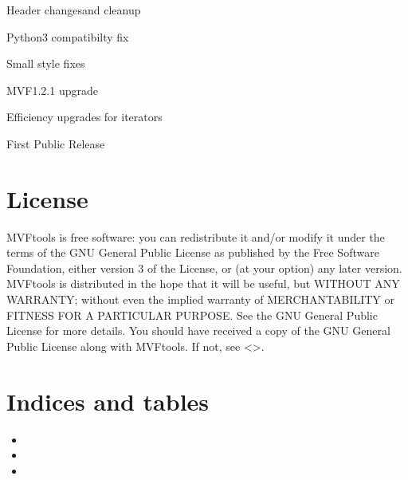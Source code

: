 \documentclass[letterpaper,11pt,english]{sphinxmanual}
\begin{document}

Header changesand cleanup


Python3 compatibilty fix


Small style fixes


MVF1.2.1 upgrade


Efficiency upgrades for iterators


First Public Release


\chapter{License}
\label{\detokenize{version:license}}
MVFtools is free software: you can redistribute it and/or modify
it under the terms of the GNU General Public License as published by
the Free Software Foundation, either version 3 of the License, or
(at your option) any later version.
MVFtools is distributed in the hope that it will be useful,
but WITHOUT ANY WARRANTY; without even the implied warranty of
MERCHANTABILITY or FITNESS FOR A PARTICULAR PURPOSE.  See the
GNU General Public License for more details.
You should have received a copy of the GNU General Public License
along with MVFtools.  If not, see \textless{}\textgreater{}.


\chapter{Indices and tables}
\label{\detokenize{index:indices-and-tables}}\begin{itemize}
\item {} 

\item {} 

\item {} 

\end{itemize}



\renewcommand{\indexname}{Index}
\printindex
\end{document}
